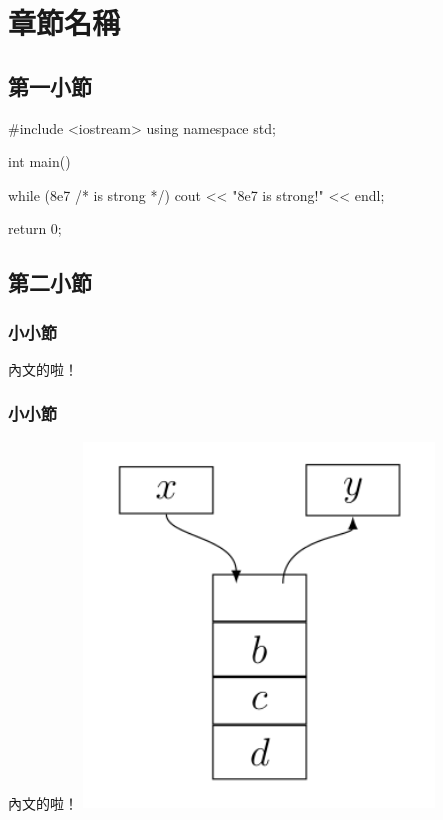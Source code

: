\chapter{章節名稱}

\section{第一小節}







\pagebreak

\begin{C++}
#include <iostream>
using namespace std;

int main() {
	while (8e7 /* is strong */) {
		cout << "8e7 is strong!" << endl;
	}

	return 0;
}
\end{C++}

\section{第二小節}

\subsection{小小節}
內文的啦！

\subsection{小小節}
內文的啦！
\includegraphics*[width = 0.7\textwidth]{images/rails}
